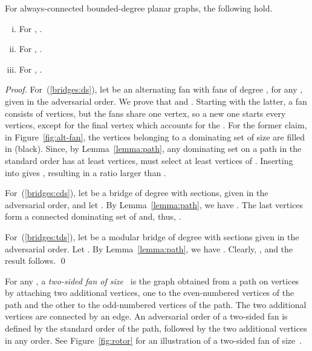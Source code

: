 \begin{proposition}
\label{prop:bridges}
For always-connected bounded-degree planar graphs, the following hold.
\begin{enumerate}[(i)]
\item \label{bridges:ds} For \ds, .
\item \label{bridges:cds} For \cds, .
\item \label{bridges:tds} For \tds, .
\end{enumerate}
\end{proposition}
\begin{proof}
For~(\ref{bridges:ds}), let  be an alternating fan with  fans of degree , for any 
, given in the adversarial order.
We prove that 
 and .
Starting with the latter, a fan consists of  vertices,
but the fans share one vertex, so a new one starts every 
vertices, except for the final vertex which accounts for the .
For the former claim,
in Figure~\ref{fig:alt-fan}, the vertices belonging to a dominating
set of size  are filled in (black).
Since, by Lemma~\ref{lemma:path}, any \incr dominating set
on a path  in the standard order has at least  vertices,
\onopt must select at least  vertices of .
Inserting  into  gives
, resulting in a ratio larger than .

For~(\ref{bridges:cds}),
let  be a bridge of degree  with  sections, given in the 
adversarial order, and let .
By Lemma~\ref{lemma:path}, we have .
The last  vertices form a connected dominating set of  and, thus,
.

For~(\ref{bridges:tds}), 
let  be a modular bridge of degree  with  sections
given in the adversarial order.
Let .
By Lemma~\ref{lemma:path}, we have .
Clearly, , and the result follows.
\qed\end{proof}


For any , a \emph{two-sided fan of size~}
is the graph obtained from a
path on  vertices by attaching two additional vertices, one to the
even-numbered vertices of the path and the other to the odd-numbered
vertices of the path. The two additional vertices are connected by
an edge. An adversarial order of a two-sided fan is defined by 
the standard order of the path, followed by the two additional
vertices in any order.
See Figure~\ref{fig:rotor} for an illustration of a two-sided fan of
size~.

